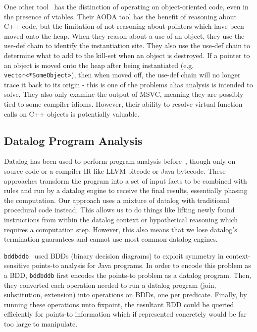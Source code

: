One other tool~\cite{dewey-uncovering-2015} has the distinction of operating on object-oriented code, even in the presence of vtables.
Their AODA tool has the benefit of reasoning about C++ code, but the limitation of not reasoning about pointers which have been moved onto the heap.
When they reason about a use of an object, they use the use-def chain to identify the instantiation site.
They also use the use-def chain to determine what to add to the kill-set when an object is destroyed.
If a pointer to an object is moved onto the heap after being instantiated (e.g. \texttt{vector<*SomeObject>}), then when moved off, the use-def chain will no longer trace it back to its origin - this is one of the problems alias analysis is intended to solve.
They also only examine the output of MSVC, meaning they are possibly tied to some compiler idioms.
However, their ability to resolve virtual function calls on C++ objects is potentially valuable.

\subsection{Datalog Program Analysis}
Datalog has been used to perform program analysis before~\cite{bddbddb,doop1}, though only on source code or a compiler IR like LLVM bitcode or Java bytecode.
These approaches transform the program into a set of input facts to be combined with rules and run by a datalog engine to receive the final results, essentially phasing the computation.
Our approach uses a mixture of datalog with traditional procedural code instead.
This allows us to do things like lifting newly found instructions from within the datalog context or hypothetical reasoning which requires a computation step.
However, this also means that we lose datalog's termination guarantees and cannot use most common datalog engines.

\texttt{bddbddb}~\cite{bddbddb} used BDDs (binary decision diagrams) to exploit symmetry in context-sensitive points-to analysis for Java programs.
In order to encode this problem as a BDD, \texttt{bddbddb} first encodes the points-to problem as a datalog program.
Then, they converted each operation needed to run a datalog program (join, substitution, extension) into operations on BDDs, one per predicate.
Finally, by running these operations unto fixpoint, the resultant BDD could be queried efficiently for points-to information which if represented concretely would be far too large to manipulate.

